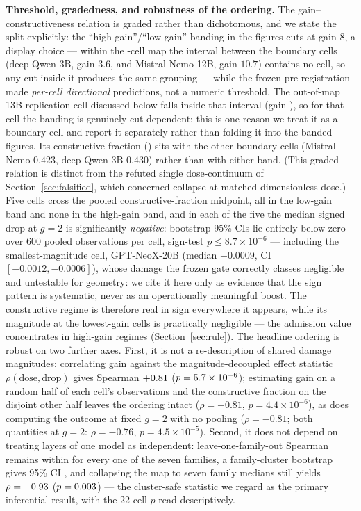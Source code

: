 \documentclass[preprint,12pt]{elsarticle}
\theoremstyle{definition}
\begin{document}
\textbf{Threshold, gradedness, and robustness of the ordering.} The
gain--constructiveness relation is graded rather than dichotomous, and we state the
split explicitly: the ``high-gain''/``low-gain'' banding in the figures cuts at gain
$8$, a display choice --- within the \nCells{}-cell map the interval between the
boundary cells (deep Qwen-3B, gain $3.6$, and Mistral-Nemo-12B, gain $10.7$) contains no
cell, so any cut inside it produces the same grouping --- while the
frozen pre-registration made \emph{per-cell directional} predictions, not a numeric
threshold. The out-of-map 13B replication cell discussed below falls inside that
interval (gain \gainThirteenB{}), so for that cell the banding is genuinely
cut-dependent; this is one reason we treat it as a boundary cell and report it
separately rather than folding it into the banded figures. Its constructive fraction
(\fracThirteenB{}) sits with the other boundary cells (Mistral-Nemo $0.423$, deep
Qwen-3B $0.430$) rather than with either band. (This graded relation is distinct from the refuted single dose-continuum
of Section~\ref{sec:falsified}, which concerned collapse at matched dimensionless
dose.) Five cells cross the pooled constructive-fraction midpoint, all in the
low-gain band and none in the high-gain band, and in each of the five the median
signed drop at $g{=}2$ is significantly \emph{negative}: bootstrap 95\% CIs lie
entirely below zero over 600 pooled observations per cell, sign-test
$p\leq 8.7\times10^{-6}$ --- including the smallest-magnitude cell, GPT-NeoX-20B
(median $-0.0009$, CI $[-0.0012,-0.0006]$), whose damage the frozen gate correctly
classes negligible and untestable for geometry: we cite it here only as evidence that
the sign pattern is systematic, never as an operationally meaningful boost. The
constructive regime is therefore real in sign everywhere it appears, while its
magnitude at the lowest-gain cells is practically negligible --- the admission value
concentrates in high-gain regimes (Section~\ref{sec:rule}). The headline ordering is
robust on two further axes. First, it is not a re-description of shared damage
magnitudes: correlating gain against the magnitude-decoupled effect statistic
$\rho(\mathrm{dose},\mathrm{drop})$ gives Spearman $+0.81{}$
($p=5.7\times10^{-6}{}$); estimating gain on a random half of each cell's observations
and the constructive fraction on the disjoint other half leaves the ordering intact
($\rho=-0.81$, $p=4.4\times10^{-6}$), as does computing the outcome at fixed $g{=}2$
with no pooling ($\rho=-0.81$; both quantities at $g{=}2$: $\rho=-0.76$,
$p=4.5\times10^{-5}$). Second, it does not depend on treating layers of one model as
independent: leave-one-family-out Spearman remains within \lofoRange{} for every one
of the seven families, a family-cluster bootstrap gives 95\% CI \famBootCI{}, and
collapsing the map to seven family medians still yields $\rho=-0.93{}$
($p=0.003{}$) --- the cluster-safe statistic we regard as the primary
inferential result, with the 22-cell $p$ read descriptively.
\end{document}
